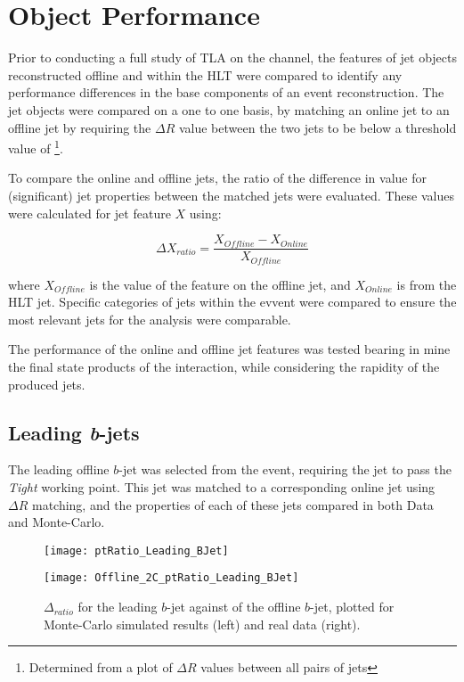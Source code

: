 \chapter{Object Performance}\label{c:OP}

Prior to conducting a full study of TLA on the \VBFHBB channel, the features of jet objects reconstructed offline and within the HLT were compared to identify any performance differences in the base components of an event reconstruction. The jet objects were compared on a one to one basis, by matching an online jet to an offline jet by requiring the $\Delta R$ value between the two jets to be below a threshold value of \DELTARTHRESHOLD\footnote{Determined from a plot of $\Delta R$ values between all pairs of jets}. 

To compare the online and offline jets, the ratio of the difference in value for (significant) jet properties between the matched jets were evaluated. These values were calculated for jet feature $X$ using:

	\begin{equation}
	\Delta X_{ratio} = \frac{X_{Offline} - X_{Online}}{X_{Offline}}
	\end{equation}
	
	where $X_{Offline}$ is the value of the feature on the offline jet, and $X_{Online}$ is from the HLT jet. Specific categories of jets within the evvent were compared to ensure the most relevant jets for the \VBFH analysis were comparable.
	
	The performance of the online and offline jet features was tested bearing in mine the final state products of the \VBFHBB interaction, while considering the rapidity of the produced jets. 

\section{Leading \textit{b}-jets}
\label{OP:leadingb}

	The leading \pt offline $b$-jet was selected from the event, requiring the jet to pass the \textit{Tight} \btagging working point. This jet was matched to a corresponding online jet using $\Delta R$ matching, and the properties of each of these jets compared in both Data and Monte-Carlo.

		\begin{figure}[h]
			\centering
			\begin{minipage}[h]{0.33\linewidth}
				\texttt{[image: ptRatio\_Leading\_BJet]}

			\end{minipage}
			\quad
			\begin{minipage}[h]{0.33\linewidth}
				\texttt{[image: Offline\_2C\_ptRatio\_Leading\_BJet]}
			\end{minipage}
			\caption{$\Delta $\pt$_{ratio}$ for the leading \pt $b$-jet against \pt of the offline $b$-jet, plotted for Monte-Carlo simulated results (left) and real data (right).}
			\label{fig:O:leadingbpt}
		\end{figure}
		
